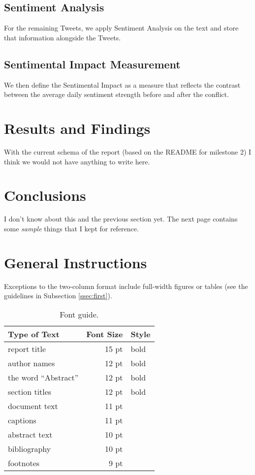 \documentclass[11pt]{article}
\begin{document}
  \subsection{Sentiment Analysis}
  \label{sub:sentiment_analysis}
    For the remaining Tweets, we apply Sentiment Analysis on the text and store that information alongside the Tweets.

  \subsection{Sentimental Impact Measurement}
  \label{sub:sentimental_impact_measurement}
    We then define the Sentimental Impact as a measure that reflects the contrast between the average daily sentiment strength before and after the conflict.

\section{Results and Findings}
With the current schema of the report (based on the README for milestone 2) I think we would not have anything to write here.

\section{Conclusions}
I don't know about this and the previous section yet.
The next page contains some \emph{sample} things that I kept for reference.

\newpage


\section{General Instructions}
Exceptions to the
two-column format include full-width figures or tables (see the guidelines in
Subsection \ref{ssec:first}).

\begin{table}[h]
\begin{center}
\begin{tabular}{|l|rl|}
\hline \bf Type of Text & \bf Font Size & \bf Style \\ \hline
report title & 15 pt & bold \\
author names & 12 pt & bold \\
the word ``Abstract'' & 12 pt & bold \\
section titles & 12 pt & bold \\
document text & 11 pt  &\\
captions & 11 pt & \\
abstract text & 10 pt & \\
bibliography & 10 pt & \\
footnotes & 9 pt & \\
\hline
\end{tabular}
\end{center}
\caption{\label{font-table} Font guide.}
\end{table}
\end{document}
